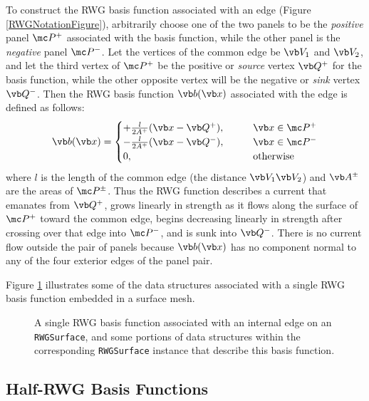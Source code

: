 To construct the RWG basis function associated with an 
edge (Figure \ref{RWGNotationFigure}), arbitrarily choose one 
of the two panels to be the \textit{positive} panel $\mc P^+$ 
associated with the basis function, while the other panel is the 
\textit{negative} panel $\mc P^-$. Let the vertices of the 
common edge be $\vb V_1$ and $\vb V_2$, and let the third vertex of 
$\mc P^+$ be the positive or \textit{source} vertex 
$\vb Q^+$ for the basis function, 
while the other opposite vertex will be the 
negative or \textit{sink} vertex $\vb Q^-$. Then 
the RWG basis function $\vb b(\vb x)$ associated with the
edge is defined as follows:
$$ \vb b(\vb x) = 
   \begin{cases}   
  +\frac{l}{2A^+}(\vb x - \vb Q^+), \qquad &\vb x \in \mc P^+ \\ 
  -\frac{l}{2A^+}(\vb x - \vb Q^-), \qquad &\vb x \in \mc P^- \\ 
   0, \qquad &\text{otherwise}
   \end{cases}
$$
where $l$ is the length of the common edge (the distance
$\vb V_1 \vb V_2$) and $\vb A^\pm$ are the areas of $\mc P^\pm$.
Thus the RWG function describes a current that emanates 
from $\vb Q^+$, grows linearly in strength as it flows along
the surface of $\mc P^+$ toward the common edge, begins
decreasing linearly in strength after crossing over that
edge into $\mc P^-$, and is sunk into $\vb Q^-$. There
is no current flow outside the pair of panels because
$\vb b(\vb x)$ has no component normal to any of the 
four exterior edges of the panel pair.

Figure \ref{RWGBasisFunctionFigure} illustrates some of the 
\lss data structures associated with a single RWG basis function
embedded in a surface mesh.
\begin{figure}[H]
\begin{center}
\caption{A single RWG basis function associated with an internal edge 
         on an \texttt{RWGSurface}, and some portions of data structures 
         within the corresponding \texttt{RWGSurface} instance that 
         describe this basis function.}
\label{RWGBasisFunctionFigure}
\end{center}
\end{figure}

\subsection*{Half-RWG Basis Functions}

